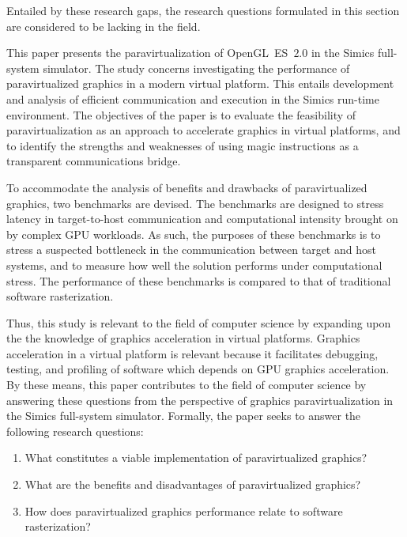 Entailed by these research gaps, the research questions formulated in this section are considered to be lacking in the field.

This paper presents the paravirtualization of OpenGL~ES~$2.0$ in the Simics full-system simulator. 
The study concerns investigating the performance of paravirtualized graphics in a modern virtual platform.
This entails development and analysis of efficient communication and execution in the Simics run-time environment.
The objectives of the paper is to evaluate the feasibility of paravirtualization as an approach to accelerate graphics in virtual platforms, and to identify the strengths and weaknesses of using magic instructions as a transparent communications bridge.

To accommodate the analysis of benefits and drawbacks of paravirtualized graphics, two benchmarks are devised.
The benchmarks are designed to stress latency in target-to-host communication and computational intensity brought on by complex GPU workloads.
As such, the purposes of these benchmarks is to stress a suspected bottleneck in the communication between target and host systems, and to measure how well the solution performs under computational stress.
The performance of these benchmarks is compared to that of traditional software rasterization.

Thus, this study is relevant to the field of computer science by expanding upon the the knowledge of graphics acceleration in virtual platforms.
Graphics acceleration in a virtual platform is relevant because it facilitates debugging, testing, and profiling of software which depends on GPU graphics acceleration.
By these means, this paper contributes to the field of computer science by answering these questions from the perspective of graphics paravirtualization in the Simics full-system simulator.
Formally, the paper seeks to answer the following research questions:

\begin{enumerate}
  \item What constitutes a viable implementation of paravirtualized graphics?
  \item What are the benefits and disadvantages of paravirtualized graphics?
  \item How does paravirtualized graphics performance relate to software rasterization?
\end{enumerate}
